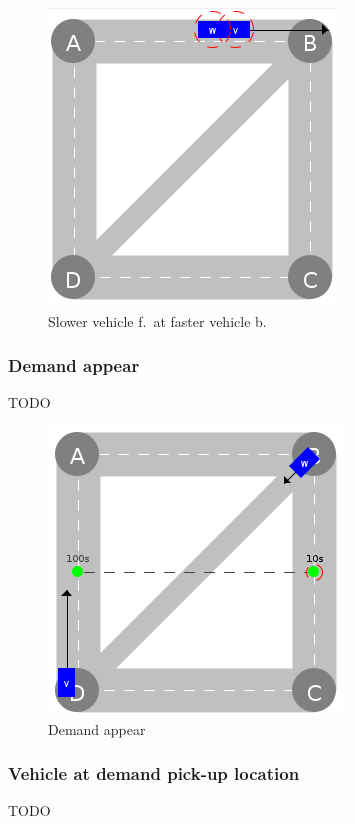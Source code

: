 \documentclass[graybox]{svmult}
\begin{document}
\begin{figure}[htbp]
	\centering
	\includegraphics[scale=0.5]{../../events/slower-vehicle-front-at-faster-vehicle-back.png}
	\caption{Slower vehicle f.\ at faster vehicle b.}
	\label{fig:slower-vehicle-front-at-faster-vehicle-back}
\end{figure}

\subsubsection{Demand appear}
TODO

\begin{figure}[htbp]
	\centering
	\includegraphics[scale=0.5]{../../events/demand.png}
	\caption{Demand appear}
	\label{fig:demand}
\end{figure}

\subsubsection{Vehicle at demand pick-up location}
TODO
\end{document}

